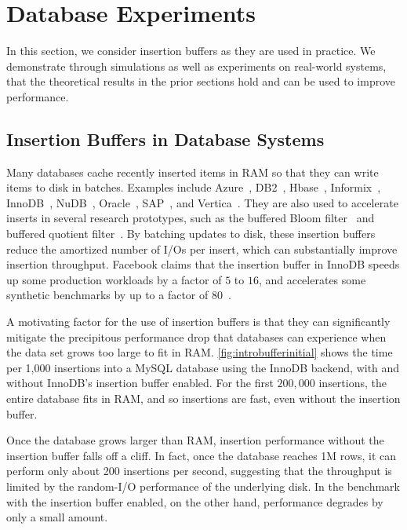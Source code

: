 \section{Database Experiments}\label{sec:br-experiments}
In this section, we consider insertion buffers as they are used in practice. We
demonstrate through simulations as well as experiments on real-world systems,
that the theoretical results in the prior sections hold and can be used to
improve performance.

\subsection{Insertion Buffers in Database Systems}
Many databases cache recently inserted items in RAM so that they can write
items to disk in batches.  Examples include
Azure~\cite{Azure16}, 
DB2~\cite{IBM17},  
Hbase~\cite{Xiang12}, 
Informix~\cite{Informix}, 
InnoDB~\cite{Callaghan11},  
NuDB~\cite{NuDB16},  
Oracle~\cite{Oracle17},  
SAP~\cite{SAP17},  and 
Vertica~\cite{Vertica17}.
They are also used to accelerate inserts in several research prototypes, such
as the buffered Bloom
filter~\cite{DBLP:conf/vldb/CanimMBLR10} and buffered quotient
filter~\cite{DBLP:journals/pvldb/BenderFJKKMMSSZ12}.  
By batching updates to disk, these insertion buffers reduce the amortized
number of I/Os per insert, which can substantially improve insertion
throughput.  Facebook claims that the insertion buffer in InnoDB speeds up some
production workloads by a factor of $5$ to $16$, and accelerates some synthetic
benchmarks by up to a factor of $80$~\cite{Callaghan11}.

A motivating factor for the use of insertion buffers is that they can
significantly mitigate the precipitous performance drop that databases can
experience when the data set grows too large to fit in RAM.
\cref{fig:introbufferinitial} shows the time per 1,000 insertions into a MySQL
database using the InnoDB backend, with and without InnoDB's insertion buffer
enabled.  For the first $200,000$ insertions, the entire database fits in RAM,
and so insertions are fast, even without the insertion buffer.

Once the database grows larger than RAM, insertion performance without the
insertion buffer falls off a cliff.  In fact, once the database reaches 1M
rows, it can perform only about 200 insertions per second, suggesting that the
throughput is limited by the random-I/O performance of the underlying disk.  In
the benchmark with the insertion buffer enabled, on the other hand, performance
degrades by only a small amount.

